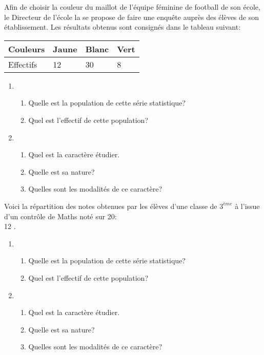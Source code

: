 \documentclass[12pt,a4paper]{report}
\begin{document}
\begin{exo}
Afin de choisir la couleur du maillot de l'équipe féminine de football de son école, le Directeur de l'école la  se propose de faire une enquête auprès des élèves de son établissement. Les résultats obtenus sont consignés dans le tableau suivant:\\
\begin{tabular}{|p{4cm}|p{2cm}|p{2cm}|p{2cm}|}
\hline 
Couleurs & Jaune & Blanc & Vert \\ 
\hline 
Effectifs & 12 & 30 & 8 \\ 
\hline 
\end{tabular} 

\begin{enumerate}
\item \begin{enumerate}
\item Quelle est la population de cette série statistique?
\item Quel est l'effectif de cette population?
\end{enumerate}
\item \begin{enumerate}
\item Quel est la caractère étudier.
\item Quelle est sa nature?
\item Quelles sont les modalités de ce caractère?
\end{enumerate}
\end{enumerate}
\end{exo}

\begin{exo}
Voici la répartition des notes obtenues par les élèves d'une classe de $3^{ème}$ à l'issue d'un contrôle de Maths noté sur 20:\\

12                         .

\begin{enumerate}
\item \begin{enumerate}
\item Quelle est la population de cette série statistique?
\item Quel est l'effectif de cette population?
\end{enumerate}
\item \begin{enumerate}
\item Quel est la caractère étudier.
\item Quelle est sa nature?
\item Quelles sont les modalités de ce caractère?
\end{enumerate}
\end{enumerate}
\end{exo}
\end{document}

